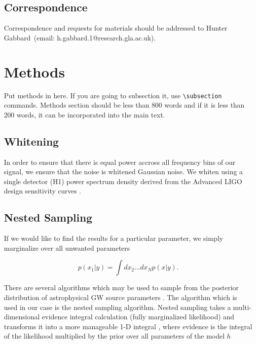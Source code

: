 \documentclass[%
showpacs,
 amsmath,amssymb,
 aps,
 twocolumn,
 prl,
 reprint,
floatfix,
]{revtex4-1}
\begin{document}
 \subsection{Correspondence} Correspondence and requests for materials should be addressed to Hunter Gabbard~(email: h.gabbard.1@research.gla.ac.uk).

\section{Methods}
%
Put methods in here.  If you are going to subsection it, use
\verb|\subsection| commands.  Methods section should be less than
800 words and if it is less than 200 words, it can be incorporated
into the main text.

\subsection{Whitening} \label{whiten_sec}

In order to ensure 
that there is equal power accross all
frequency bins of our signal, we ensure that the noise is whitened Gaussian
noise. We whiten using a single detector (H1) power spectrum density derived from the
Advanced LIGO design sensitivity curves \cite{2016LRR....19....1A}. 

\subsection{Nested Sampling} \label{nested_sec}
%
%
If we would like to find the results for a particular parameter, 
we simply marginalize over all unwanted parameters 

\begin{equation}
    p(x_1|y) = \int dx_2 ... dx_N p(x|y).
\end{equation}

There are several algorithms which may be used to sample from the posterior
distribution of astrophysical GW source parameters \cite{PhysRevD.64.022001,
skilling2006,10.1111/j.1365-2966.2011.20288.x}. The
algorithm which is used in our case is the nested sampling algorithm. Nested
sampling takes a multi-dimensional evidence integral calculation (fully
marginalized likelihood) and transforms it into a more manageable 1-D integral
, where evidence is the integral of the likelihood 
multiplied by the prior over all parameters of the model $h$ ~\cite{1409.7215}
\end{document}
